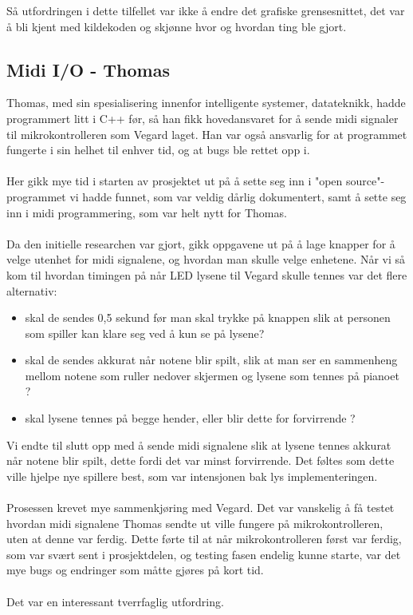 Så utfordringen i dette tilfellet var ikke å endre det grafiske grensesnittet, det var å bli kjent med kildekoden og skjønne hvor og hvordan ting ble gjort. 

\subsection{Midi I/O - Thomas}
Thomas, med sin spesialisering innenfor intelligente systemer, datateknikk, hadde programmert litt i C++ før, så han fikk hovedansvaret for å sende midi signaler til mikrokontrolleren som Vegard laget. Han var også ansvarlig for at programmet fungerte i sin helhet til enhver tid, og at bugs ble rettet opp i.\\\\
Her gikk mye tid i starten av prosjektet ut på å sette seg inn i "open source"-programmet vi hadde funnet, som var veldig dårlig dokumentert, samt å sette seg inn i midi programmering, som var helt nytt for Thomas.\\\\
Da den initielle researchen var gjort, gikk oppgavene ut på å lage knapper for å velge utenhet for midi signalene, og hvordan man skulle velge enhetene.
Når vi så kom til hvordan timingen på når LED lysene til Vegard skulle tennes var det flere alternativ:\\
\begin{itemize}
\item 
skal de sendes 0,5 sekund før man skal trykke på knappen slik at personen som spiller kan klare seg ved å kun se på lysene?
\item
skal de sendes akkurat når notene blir spilt, slik at man ser en sammenheng mellom notene som ruller nedover skjermen og lysene som tennes på pianoet ?
\item
skal lysene tennes på begge hender, eller blir dette for forvirrende ?
\end{itemize}
Vi endte til slutt opp med å sende midi signalene slik at lysene tennes akkurat når notene blir spilt, dette fordi det var minst forvirrende. Det føltes som dette ville hjelpe nye spillere best, som var intensjonen bak lys implementeringen.\\\\
Prosessen krevet mye sammenkjøring med Vegard. Det var vanskelig å få testet hvordan midi signalene Thomas sendte ut ville fungere på mikrokontrolleren, uten at denne var ferdig. Dette førte til at når mikrokontrolleren først var ferdig, som var svært sent i prosjektdelen, og testing fasen endelig kunne starte, var det mye bugs og endringer som måtte gjøres på kort tid.\\\\
Det var en interessant tverrfaglig utfordring.

